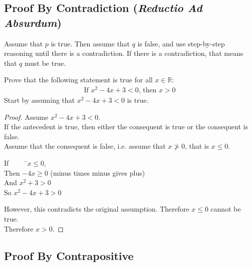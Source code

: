 \documentclass[../notes.tex]{subfiles}
\begin{document}
			\subsection[Proof By Contradiction]{Proof By Contradiction (\textit{Reductio Ad Absurdum})}
				Assume that $p$ is true. Then assume that $q$ is false, and use step-by-step reasoning until there is a contradiction. If there is a contradiction, that means that $q$ must be true.
				\begin{example}
					Prove that the following statement is true for all $x \in \mathbb{R}$:
					\begin{align*}
						\text{If } x^{2} - 4x + 3 < 0 \text{, then } x > 0
					\end{align*}
					Start by assuming that $x^{2} - 4x + 3 < 0$ is true.
					\begin{proof}
						Assume $x^{2} - 4x + 3 < 0$.\\
						If the antecedent is true, then either the consequent is true or the consequent is false.\\
						Assume that the consequent is false, i.e. assume that $x \not > 0$, that is $x \leq 0$.
						\begin{tabbing}
							If $\qquad$ \=$x \leq 0$,\\
							Then \>$-4x \geq 0$ (minus times minus gives plus)\\
							And \>$x^{2} + 3 > 0$\\
							So \>$x^{2} - 4x + 3 > 0$
						\end{tabbing}
						However, this contradicts the original assumption. Therefore $x \leq 0$ cannot be true.\\
						Therefore $x > 0$.
					\end{proof}
				\end{example}
			\subsection{Proof By Contrapositive}
\end{document}
